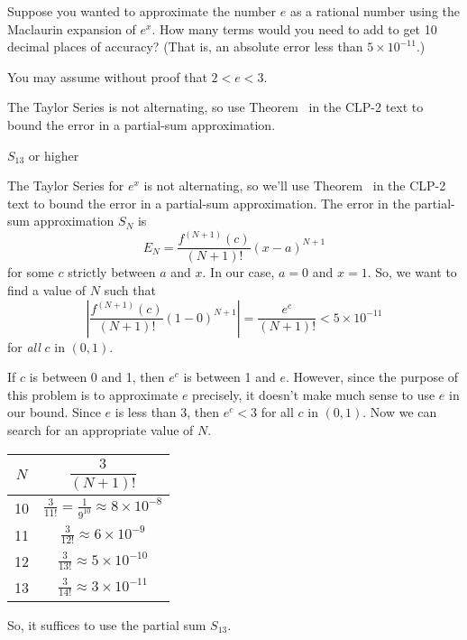 \begin{question}
	Suppose you wanted to approximate the number $e$ as a rational number using the Maclaurin expansion of $e^x$. How many terms would you need to add to get 10 decimal places of accuracy?
	(That is, an absolute error less than $5\times10^{-11}$.)

	You may assume without proof that $2<e<3$.
\end{question}
\begin{hint}
	The Taylor Series is not alternating, so use  Theorem~ in the CLP-2 text to bound the error in a partial-sum approximation.
\end{hint}
\begin{answer}
$S_{13}$	or higher
\end{answer}
\begin{solution}The Taylor Series for $e^x$ is not alternating, so we'll use  Theorem~ in the CLP-2 text to bound the error in a partial-sum approximation. The error in the partial-sum approximation $S_N$ is
	\[E_N=\frac{f^{(N+1)}(c)}{(N+1)!}(x-a)^{N+1}\]
	for some $c$ strictly between $a$ and $x$. In our case, $a=0$ and $x=1$. So, we want to find a value of $N$ such that
	\[\left|\frac{f^{(N+1)}(c)}{(N+1)!}\left(1-0\right)^{N+1}\right|=\frac{e^c}{(N+1)!}<5\times 10^{-11}\]
	for \emph{all} $c$ in $(0,1)$.

	If $c$ is between 0 and 1, then $e^c$ is between 1 and $e$. However, since the purpose of this problem is to approximate $e$ precisely, it doesn't make much sense to use $e$ in our bound. Since $e$ is less than 3, then $e^c<3$ for all $c$ in $(0,1)$. Now we can search for an appropriate value of $N$.

	\begin{center}
		\begin{tabular}{|c|c|}
			\hline
			$N$&$ \dfrac{3}{(N+1)!}$\\ \hline
			10 & $\displaystyle \frac{3}{11!}=\frac{1}{9^{10}}\approx 8\times 10^{-8}$\\\hline
			11 & $\displaystyle \frac{3}{12!}\approx 6\times 10^{-9}$\\\hline
			12 & $\displaystyle \frac{3}{13!}\approx 5\times 10^{-10}$\\\hline
			13 & $\displaystyle \frac{3}{14!}\approx 3\times 10^{-11}$\\
			\hline
		\end{tabular}
	\end{center}
	So, it suffices to use the partial sum $S_{13}$.
\end{solution}



